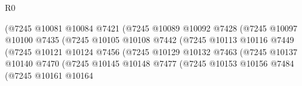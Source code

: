 \begin{lexlean}{R0}
\begin{coremodule}
                                            (@7245
                                              @10081
                                              @10084
                                              @7421
                                              (@7245
                                                @10089
                                                @10092
                                                @7428
                                                (@7245
                                                  @10097
                                                  @10100
                                                  @7435
                                                  (@7245
                                                    @10105
                                                    @10108
                                                    @7442
                                                    (@7245
                                                      @10113
                                                      @10116
                                                      @7449
                                                      (@7245
                                                        @10121
                                                        @10124
                                                        @7456
                                                        (@7245
                                                          @10129
                                                          @10132
                                                          @7463
                                                          (@7245
                                                            @10137
                                                            @10140
                                                            @7470
                                                            (@7245
                                                              @10145
                                                              @10148
                                                              @7477
                                                              (@7245
                                                                @10153
                                                                @10156
                                                                @7484
                                                                (@7245
                                                                  @10161
                                                                  @10164

\end{coremodule}
\end{lexlean}
